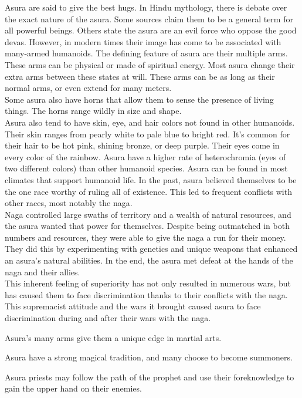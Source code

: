﻿
{Asura are said to give the best hugs.}
{}
{In Hindu mythology, there is debate over the exact nature of the asura. Some sources claim them to be a general term for all powerful beings. Others state the asura are an evil force who oppose the good devas. However, in modern times their image has come to be associated with many-armed humanoids.}
{The defining feature of asura are their multiple arms. These arms can be physical or made of spiritual energy. Most asura change their extra arms between these states at will. These arms can be as long as their normal arms, or even extend for many meters.\\
Some asura also have horns that allow them to sense the presence of living things. The horns range wildly in size and shape.\\
Asura also tend to have skin, eye, and hair colors not found in other humanoids. Their skin ranges from pearly white to pale blue to bright red. It's common for their hair to be hot pink, shining bronze, or deep purple. Their eyes come in every color of the rainbow. Asura have a higher rate of heterochromia (eyes of two different colors) than other humanoid species.}
{Asura can be found in most climates that support humanoid life.}
{In the past, asura believed themselves to be the one race worthy of ruling all of existence. This led to frequent conflicts with other races, most notably the naga.\\
Naga controlled large swaths of territory and a wealth of natural resources, and the asura wanted that power for themselves. Despite being outmatched in both numbers and resources, they were able to give the naga a run for their money. They did this by experimenting with genetics and unique weapons that enhanced an asura's natural abilities. In the end, the asura met defeat at the hands of the naga and their allies.\\
This inherent feeling of superiority has not only resulted in numerous wars, but has caused them to face discrimination thanks to their conflicts with the naga.\\
This supremacist attitude and the wars it brought caused asura to face discrimination during and after their wars with the naga.}
{
\item Asura's many arms give them a unique edge in martial arts.
\item Asura have a strong magical tradition, and many choose to become summoners.
\item Asura priests may follow the path of the prophet and use their foreknowledge to gain the upper hand on their enemies.}
